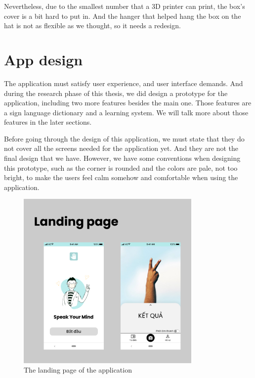 Nevertheless, due to the smallest number that a 3D printer can print, the box's cover is a bit hard to put in. And the hanger that helped hang the box on the hat is not as flexible as we thought, so it needs a redesign.

\section{App design}

The application must satisfy user experience, and user interface demands. And during the research phase of this thesis, we did design a prototype for the application, including two more features besides the main one. Those features are a sign language dictionary and a learning system. We will talk more about those features in the later sections.

Before going through the design of this application, we must state that they do not cover all the screens needed for the application yet. And they are not the final design that we have. However, we have some conventions when designing this prototype, such as the corner is rounded and the colors are pale, not too bright, to make the users feel calm somehow and comfortable when using the application.

\begin{figure}[H]
  \centering
  \includegraphics[width=0.8\textwidth]{img/Chap5/Landing_page.png}
  \caption{The landing page of the application}
\end{figure}

